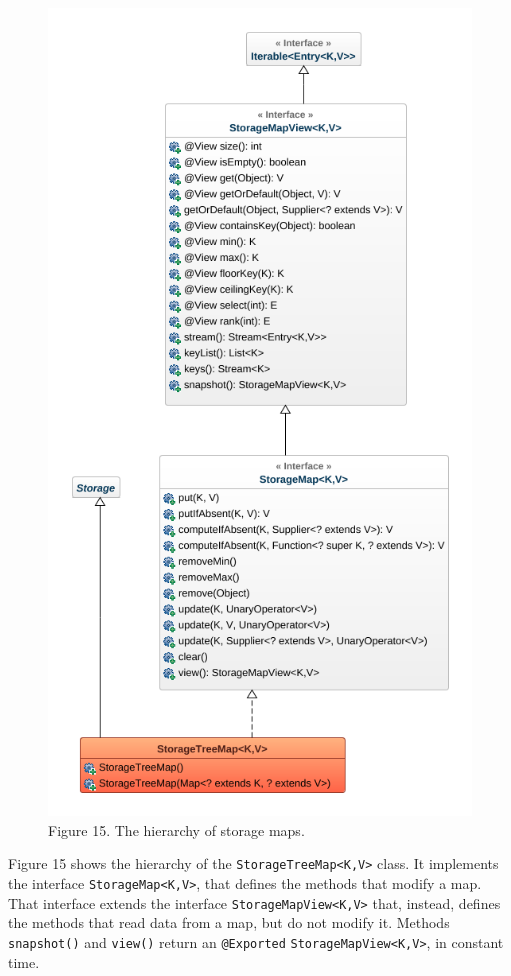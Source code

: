 \documentclass[a4paper,]{book}
\begin{document}
{\begin{figure}
\centering
\includegraphics{pics/maps.png}
\caption{Figure 15. The hierarchy of storage maps.}
\end{figure}

Figure 15 shows the hierarchy of the
\texttt{StorageTreeMap\textless{}K,V\textgreater{}} class. It implements
the interface \texttt{StorageMap\textless{}K,V\textgreater{}}, that
defines the methods that modify a map. That interface extends the
interface \texttt{StorageMapView\textless{}K,V\textgreater{}} that,
instead, defines the methods that read data from a map, but do not
modify it. Methods \texttt{snapshot()} and \texttt{view()} return an
\texttt{@Exported} \texttt{StorageMapView\textless{}K,V\textgreater{}},
in constant time.

}
\end{document}
